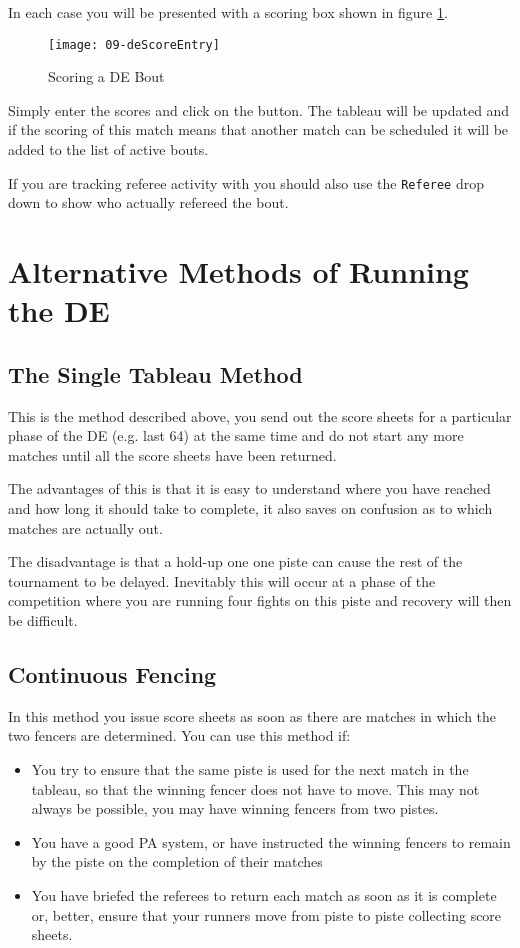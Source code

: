\documentclass[a4paper,11pt]{memoir}
\begin{document}
In each case you will be presented with a scoring box shown in figure \ref{fig:09-deScoreEntry}.

\begin{figure}[!ht]
 \centering
 \texttt{[image: 09-deScoreEntry]}
 \caption{Scoring a DE Bout} \label{fig:09-deScoreEntry}
\end{figure}

Simply enter the scores and click on the  button. The tableau will be updated and if the scoring of this match means that another match can be scheduled it will be added to the list of active bouts. 

If you are tracking referee activity with \fencingtime{} you should also use the \texttt{Referee} drop down to show who actually refereed the bout.

\section{Alternative Methods of Running the DE}

\subsection{The Single Tableau Method}

This is the method described above, you send out the score sheets for a particular phase of the DE (e.g. last 64) at the same time and do not start any more matches until all the score sheets have been returned.

The advantages of this is that it is easy to understand where you have reached and how long it should take to complete, it also saves on confusion as to which matches are actually out.

The disadvantage is that a hold-up one one piste can cause the rest of the tournament to be delayed. Inevitably this will occur at a phase of the competition where you are running four fights on this piste and recovery will then be difficult.

\subsection{Continuous Fencing}

In this method you issue score sheets as soon as there are matches in which the two fencers are determined. You can use this method if:

\begin{itemize}
 \item You try to ensure that the same piste is used for the next match in the tableau, so that the winning fencer does not have to move. This may not always be possible, you may have winning fencers from two pistes.
 \item You have a good PA system, or have instructed the winning fencers to remain by the piste on the completion of their matches
 \item You have briefed the referees to return each match as soon as it is complete or, better, ensure that your runners move from piste to piste collecting score sheets. 
\end{itemize}
\end{document}
